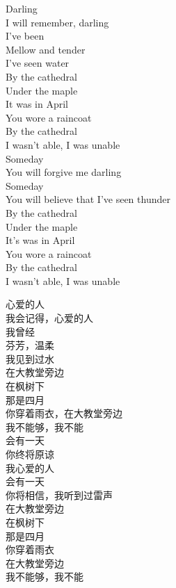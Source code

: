 \documentclass[12pt,a4paper]{article}
\begin{document}
	\begin{figure}[H] %
	\begin{multicols}{2}
		\shortpoem{}{}{}
		Darling \\
		I will remember, darling \\
		I've been \\
		Mellow and tender \\
		I've seen water \\
		By the cathedral \\
		Under the maple \\
		It was in April \\
		You wore a raincoat \\
		By the cathedral \\
		I wasn't able, I was unable \\
		Someday \\
		You will forgive me darling \\
		Someday \\
		You will believe that I've seen thunder \\
		By the cathedral \\
		Under the maple \\
		It's was in April \\
		You wore a raincoat \\
		By the cathedral \\
		I wasn't able, I was unable \\
		\endshortpoem

		\shortpoem{}{}{}
		心爱的人 \\
		我会记得，心爱的人 \\
		我曾经 \\
		芬芳，温柔 \\
		我见到过水 \\
		在大教堂旁边 \\
		在枫树下 \\
		那是四月 \\
		你穿着雨衣，在大教堂旁边 \\
		我不能够，我不能 \\
		会有一天 \\
		你终将原谅 \\
		我心爱的人 \\
		会有一天 \\
		你将相信，我听到过雷声 \\
		在大教堂旁边 \\
		在枫树下 \\
		那是四月 \\
		你穿着雨衣 \\
		在大教堂旁边 \\
		我不能够，我不能 \\
		\endshortpoem
	\end{multicols}
	\end{figure} %
\end{document}
